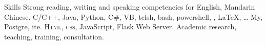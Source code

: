 
\begin{rubric}{Skills}
\entry*[Languages]
	Strong reading, writing and speaking competencies for English, Mandarin Chinese.
%	
	C/C++, Java, Python, C\#, VB, tclsh, bash, powershell, , \LaTeX, \ldots
%	
\entry*[Databases]
	My, Postgre, ite.
%	
	\textsc{Html, css}, JavaScript, Flask Web Server.
%	
\entry*[Misc.]
	Academic research, teaching, training, consultation.
\end{rubric}
